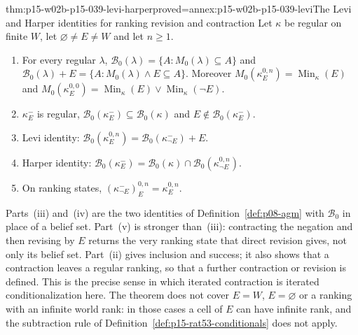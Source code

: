 \begin{hbtheorem}{thm:p15-w02b-p15-039-levi-harper}{proved=annex:p15-w02b-p15-039-levi}{The Levi and Harper identities for ranking revision and contraction}
Let \(\kappa\) be regular on finite \(W\), let \(\varnothing\ne E\ne W\)
and let \(n\geq1\).
\begin{enumerate}
\item For every regular \(\lambda\),
 \(\mathcal B_0(\lambda)=\{A:M_0(\lambda)\subseteq A\}\) and
 \(\mathcal B_0(\lambda)+E=\{A:M_0(\lambda)\land E\subseteq A\}\).
 Moreover \(M_0(\kappa^{0,n}_E)=\operatorname{Min}_\kappa(E)\) and
 \(M_0(\kappa^{0,0}_E)=\operatorname{Min}_\kappa(E)\lor\operatorname{Min}_\kappa(\neg E)\).
\item \(\kappa^{-}_E\) is regular,
 \(\mathcal B_0(\kappa^{-}_E)\subseteq\mathcal B_0(\kappa)\) and
 \(E\notin\mathcal B_0(\kappa^{-}_E)\).
\item Levi identity:
 \(\mathcal B_0(\kappa^{0,n}_E)=\mathcal B_0(\kappa^{-}_{\neg E})+E\).
\item Harper identity:
 \(\mathcal B_0(\kappa^{-}_E)=\mathcal B_0(\kappa)\cap\mathcal B_0(\kappa^{0,n}_{\neg E})\).
\item On ranking states,
 \((\kappa^{-}_{\neg E})^{0,n}_E=\kappa^{0,n}_E\).
\end{enumerate}
\end{hbtheorem}

Parts~(iii) and~(iv) are the two identities of
Definition~\ref{def:p08-agm} with \(\mathcal B_0\) in place of a belief set.
Part~(v) is stronger than~(iii): contracting the negation and then revising
by \(E\) returns the very ranking state that direct revision gives, not only
its belief set.  Part~(ii) gives inclusion and success; it also shows that a
contraction leaves a regular ranking, so that a further contraction or
revision is defined.  This is the precise sense in which iterated contraction
is iterated conditionalization here.  The theorem does not cover \(E=W\),
\(E=\varnothing\) or a ranking with an infinite world rank: in those cases a
cell of \(E\) can have infinite rank, and the subtraction rule of
Definition~\ref{def:p15-rat53-conditionals} does not apply.

